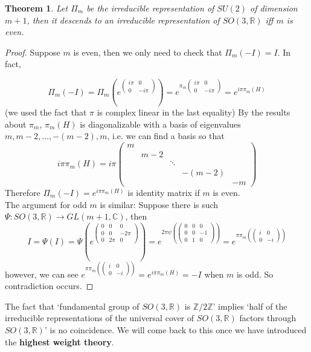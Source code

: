 \documentclass[11pt]{book}
\newtheorem{theorem}{Theorem}[section]
\newcommand{\bb}[1]{\mathbb{#1}}
\begin{document}
\begin{theorem}
Let $\Pi_m$ be the irreducible representation of $SU(2)$ of dimension $m+1$, then it descends to an irreducible representation of $SO(3,\bb{R})$ iff $m$ is even.
\end{theorem}
\begin{proof}
Suppose $m$ is even, then we only need to check that $\Pi_m(- I) = I$. In fact,

$$\Pi_m(-I) = \Pi_m(e^{\left( \begin{array}{cc}
i\pi & 0 \\
0 & -i\pi \end{array} \right)}) = e^{\pi_m\left( \begin{array}{cc}
i\pi & 0 \\
0 & -i\pi \end{array} \right)} = e^{i\pi \pi_m(H)}$$
(we used the fact that $\pi$ is complex linear in the last equality)
By the results about $\pi_m$, $\pi_m(H)$ is diagonalizable with a basis of eigenvalues $m, m-2, \dots, -(m-2),m$, i.e. we can find a basis so that
$$i\pi \pi_m(H) = i\pi \left( \begin{array}{ccccc}
m & & & & \\
 & m-2 & & &\\
  & & \ddots & & \\
  & & & -(m-2) & \\
  & & & & -m \end{array} \right)$$
Therefore $\Pi_m(-I) = e^{i\pi \pi_m(H)}$ is identity matrix if $m$ is even.\\
The argument for odd $m$ is similar: Suppose there is such $\Psi : SO(3,\bb{R}) \to GL(m+1,\bb{C})$, then
$$I = \Psi(I)= \Psi(e^{\left( \begin{array}{ccc}
0 & 0 & 0 \\
0& 0& -2\pi\\
0 & 2\pi & 0 \end{array} \right)}) = e^{2\pi \psi(\left( \begin{array}{ccc}
0 & 0 & 0 \\
0& 0& -1\\
0 & 1 & 0 \end{array} \right))} = e^{\pi \pi_m(\left( \begin{array}{cc}
 i & 0\\
0 & -i \end{array} \right))}$$
however, we can see $e^{\pi \pi_m(\left( \begin{array}{cc}
 i & 0\\
0 & -i \end{array} \right))} = e^{i\pi\pi_m(H)} = -I$ when $m$ is odd. So contradiction occurs.
\end{proof}
The fact that `fundamental group of $SO(3,\bb{R})$ is $\bb{Z}/2\bb{Z}$' implies `half of the irreducible representations of the universal cover of $SO(3,\bb{R})$ factors through $SO(3,\bb{R})$' is no coincidence. We will come back to this once we have introduced the \textbf{highest weight theory}.
\end{document}
